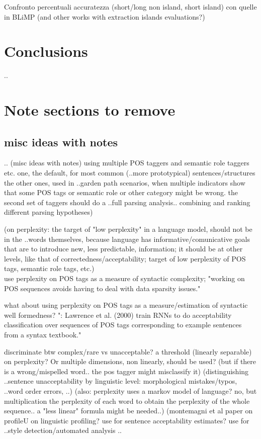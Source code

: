Confronto percentuali accuratezza (short/long non island, short island) con quelle in BLiMP
(and other works with extraction islands evaluations?)

\chapter{Conclusions}
..

\chapter{Note sections to remove}
\section{misc ideas with notes}

..
(misc ideas with notes)
using multiple POS taggers and semantic role taggers etc.
one, the default, for most common (..more prototypical) sentences/structures
the other ones, used in ..garden path scenarios, when multiple indicators show that some POS tags or semantic role or other category might be wrong.
the second set of taggers should do a ..full parsing analysis.. combining and ranking different parsing hypotheses)


(on perplexity: the target of "low perplexity" in a language model, should not be in the ..words themselves, because language has informative/comunicative goals that are to introduce new, less predictable, information; it should be at other levels, like that of correctedness/acceptability; target of low perplexity of POS tags, semantic role tags, etc.) \\
\citet{von2018pos} use perplexity on POS tags as a measure of syntactic complexity;
"working on POS sequences avoids having to deal with data sparsity issues." \citep{von2018pos}

what about using perplexity on POS tags as a measure/estimation of syntactic well formedness?
": Lawrence et al. (2000) train RNNs to do
acceptability classification over sequences of POS
tags corresponding to example sentences from a
syntax textbook."

discriminate btw complex/rare vs unacceptable? a threshold (linearly separable) on perplexity? Or multiple dimensions, non linearly, should be used?
(but if there is a wrong/mispelled word.. the pos tagger might misclassify it)
(distinguishing ..sentence unacceptability by linguistic level: morphological mistakes/typos, ..word order errors, ..)
(also: perplexity uses a markov model of language? no, but multiplication the perplexity of each word to obtain the perplexity of the whole sequence.. a "less linear" formula might be needed..)
(montemagni et al paper on profileU on linguistic profiling? use for sentence acceptability estimates? use for ..style detection/automated analysis ..


